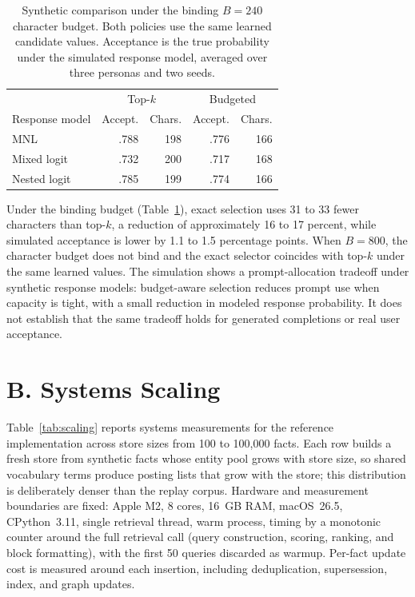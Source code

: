 \documentclass[letterpaper]{article} %
\begin{document}
\begin{table}[t]
\centering
\small
\begin{tabular}{@{}lrrrr@{}}
\toprule
& \multicolumn{2}{c}{Top-$k$} & \multicolumn{2}{c}{Budgeted} \\
Response model & Accept. & Chars. & Accept. & Chars. \\
\midrule
MNL & .788 & 198 & .776 & 166 \\
Mixed logit & .732 & 200 & .717 & 168 \\
Nested logit & .785 & 199 & .774 & 166 \\
\bottomrule
\end{tabular}
\caption{Synthetic comparison under the binding $B=240$ character budget. Both policies use the same learned candidate values. Acceptance is the true probability under the simulated response model, averaged over three personas and two seeds.}
\label{tab:budgeted_selection_sim}
\end{table}

Under the binding budget (Table~\ref{tab:budgeted_selection_sim}), exact selection uses 31 to 33 fewer characters than top-$k$, a reduction of approximately 16 to 17 percent, while simulated acceptance is lower by 1.1 to 1.5 percentage points. When $B=800$, the character budget does not bind and the exact selector coincides with top-$k$ under the same learned values. The simulation shows a prompt-allocation tradeoff under synthetic response models: budget-aware selection reduces prompt use when capacity is tight, with a small reduction in modeled response probability. It does not establish that the same tradeoff holds for generated completions or real user acceptance.

\section{B. Systems Scaling}

Table~\ref{tab:scaling} reports systems measurements for the reference implementation across store sizes from 100 to 100{,}000 facts. Each row builds a fresh store from synthetic facts whose entity pool grows with store size, so shared vocabulary terms produce posting lists that grow with the store; this distribution is deliberately denser than the replay corpus. Hardware and measurement boundaries are fixed: Apple M2, 8 cores, 16~GB RAM, macOS~26.5, CPython~3.11, single retrieval thread, warm process, timing by a monotonic counter around the full retrieval call (query construction, scoring, ranking, and block formatting), with the first 50 queries discarded as warmup. Per-fact update cost is measured around each insertion, including deduplication, supersession, index, and graph updates.
\end{document}
